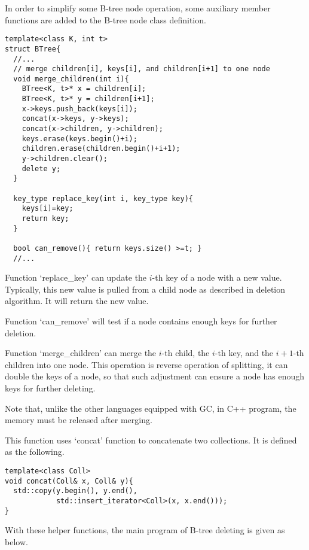 \documentclass{article}
\begin{document}
In order to simplify some B-tree node operation, some auxiliary 
member functions are added to the B-tree node class definition.

\lstset{language=C++}
\begin{lstlisting}
template<class K, int t>
struct BTree{
  //...
  // merge children[i], keys[i], and children[i+1] to one node
  void merge_children(int i){
    BTree<K, t>* x = children[i];
    BTree<K, t>* y = children[i+1];
    x->keys.push_back(keys[i]);
    concat(x->keys, y->keys);
    concat(x->children, y->children);
    keys.erase(keys.begin()+i);
    children.erase(children.begin()+i+1);
    y->children.clear();
    delete y;
  }

  key_type replace_key(int i, key_type key){
    keys[i]=key;
    return key;
  }

  bool can_remove(){ return keys.size() >=t; }
  //...
\end{lstlisting}

Function `replace\_key' can update the $i$-th key of a node with a
new value. Typically, this new value is pulled from a child node as
described in deletion algorithm. It will return the new value.

Function `can\_remove' will test if a node contains enough keys for
further deletion.

Function `merge\_children' can merge the $i$-th child, the $i$-th key,
and the $i+1$-th children into one node. This operation is reverse
operation of splitting, it can double the keys of a node, so that
such adjustment can ensure a node has enough keys for further deleting.

Note that, unlike the other languages equipped with GC, in C++ program,
the memory must be released after merging.

This function uses `concat' function to concatenate two collections.
It is defined as the following.

\begin{lstlisting}
template<class Coll>
void concat(Coll& x, Coll& y){
  std::copy(y.begin(), y.end(), 
            std::insert_iterator<Coll>(x, x.end()));
}
\end{lstlisting}

With these helper functions, the main program of B-tree deleting
is given as below.
\end{document}
